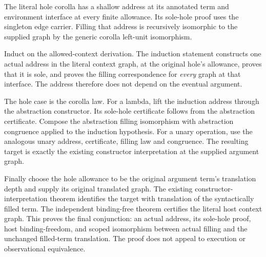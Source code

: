 The literal hole corolla has a shallow address at its annotated term and
environment interface at every finite allowance. Its sole-hole proof uses
the singleton edge carrier. Filling that address is recursively isomorphic
to the supplied graph by the generic corolla left-unit isomorphism.









Induct on the allowed-context derivation. The induction statement constructs
one actual address in the literal context graph, at the original hole's
allowance, proves that it is sole, and proves the filling correspondence
for \emph{every} graph at that interface. The address therefore does not
depend on the eventual argument.

The hole case is the corolla law. For a lambda, lift the induction address
through the abstraction constructor. Its sole-hole certificate follows from
the abstraction certificate. Compose the abstraction filling isomorphism
with abstraction congruence applied to the induction hypothesis. For a unary
operation, use the analogous unary address, certificate, filling law and
congruence. The resulting target is exactly the existing constructor
interpretation at the supplied argument graph.

Finally choose the hole allowance to be the original argument term's
translation depth and supply its original translated graph. The existing
constructor-interpretation theorem identifies the target with translation
of the syntactically filled term. The independent binding-free theorem
certifies the literal host context graph. This proves the final conjunction:
an actual address, its sole-hole proof, host binding-freedom, and scoped
isomorphism between actual filling and the unchanged filled-term translation.
The proof does not appeal to execution or observational equivalence.






